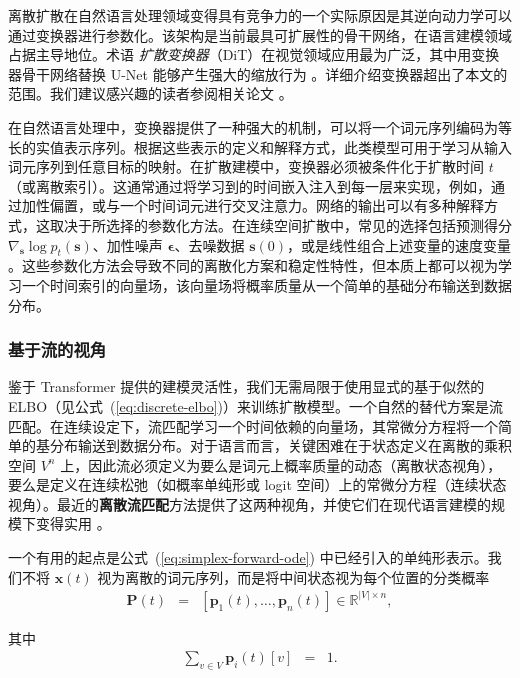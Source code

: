 离散扩散在自然语言处理领域变得具有竞争力的一个实际原因是其逆向动力学可以通过变换器进行参数化。该架构是当前最具可扩展性的骨干网络，在语言建模领域占据主导地位。术语 \textit{扩散变换器}（DiT）在视觉领域应用最为广泛，其中用变换器骨干网络替换 U-Net 能够产生强大的缩放行为 \citep{peebles-and-xie:2023scalable}。详细介绍变换器超出了本文的范围。我们建议感兴趣的读者参阅相关论文 \citep{vaswani-etal:2017attention,xiao-and-zhu:2023introduction}。

在自然语言处理中，变换器提供了一种强大的机制，可以将一个词元序列编码为等长的实值表示序列。根据这些表示的定义和解释方式，此类模型可用于学习从输入词元序列到任意目标的映射。在扩散建模中，变换器必须被条件化于扩散时间 $t$（或离散索引）。这通常通过将学习到的时间嵌入注入到每一层来实现，例如，通过加性偏置，或与一个时间词元进行交叉注意力。网络的输出可以有多种解释方式，这取决于所选择的参数化方法。在连续空间扩散中，常见的选择包括预测得分 $\nabla_{\mathbf{s}} \log p_t(\mathbf{s})$、加性噪声 $\boldsymbol{\epsilon}$、去噪数据 $\mathbf{s}(0)$，或是线性组合上述变量的速度变量 \citep{ho-eatl:2020denoising,salimans-and-ho:2022progressive}。这些参数化方法会导致不同的离散化方案和稳定性特性，但本质上都可以视为学习一个时间索引的向量场，该向量场将概率质量从一个简单的基础分布输送到数据分布。
\subsubsection{基于流的视角}

鉴于 Transformer 提供的建模灵活性，我们无需局限于使用显式的基于似然的 ELBO（见公式~(\ref{eq:discrete-elbo})）来训练扩散模型。一个自然的替代方案是流匹配。在连续设定下，流匹配学习一个时间依赖的向量场，其常微分方程将一个简单的基分布输送到数据分布。对于语言而言，关键困难在于状态定义在离散的乘积空间 $V^n$ 上，因此流必须定义为要么是词元上概率质量的动态（离散状态视角），要么是定义在连续松弛（如概率单纯形或 logit 空间）上的常微分方程（连续状态视角）。最近的\textbf{离散流匹配}方法提供了这两种视角，并使它们在现代语言建模的规模下变得实用 \citep{gat-etal:2024discrete,campbell-etal:2024generative,shaul-etal:2025flow}。

一个有用的起点是公式~(\ref{eq:simplex-forward-ode}) 中已经引入的单纯形表示。我们不将 $\mathbf{x}(t)$ 视为离散的词元序列，而是将中间状态视为每个位置的分类概率
\begin{eqnarray}
\mathbf{P}(t) & = & [\mathbf{p}_1(t), \dots, \mathbf{p}_n(t)]
\in \mathbb{R}^{|V|\times n},
\end{eqnarray}

\noindent 其中
\begin{eqnarray}
\sum_{v\in V} \mathbf{p}_i(t)[v] & = &  1.
\end{eqnarray}

